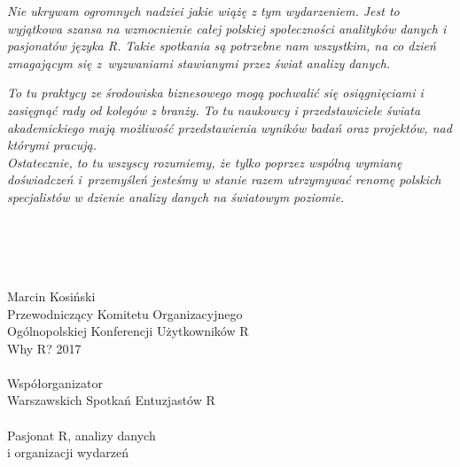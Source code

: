   \textit{Nie ukrywam ogromnych nadziei jakie wiążę z tym wydarzeniem. Jest to wyjątkowa szansa na wzmocnienie całej polskiej społeczności analityków danych i pasjonatów języka R. Takie spotkania są potrzebne nam wszystkim, na co dzień zmagającym się z~wyzwaniami stawianymi przez świat analizy danych.}

  \textit{To tu praktycy ze środowiska biznesowego mogą pochwalić się osiągnięciami i zasięgnąć rady od kolegów z branży. To tu naukowcy i przedstawiciele świata akademickiego mają możliwość przedstawienia wyników badań oraz projektów, nad którymi pracują.\\ Ostatecznie, to tu wszyscy rozumiemy, że tylko poprzez wspólną wymianę doświadczeń i~przemyśleń jesteśmy w stanie razem utrzymywać renomę polskich specjalistów w dzienie analizy danych na światowym poziomie.}

\begin{flushright}
\ \\ \ \\ \ \\ \ \\
Marcin Kosiński \\
Przewodniczący Komitetu Organizacyjnego \\
Ogólnopolskiej Konferencji Użytkowników R  \\
Why R? 2017 \\
\ \\
Współorganizator \\
Warszawskich Spotkań Entuzjastów R \\
\ \\
Pasjonat R, analizy danych \\
i organizacji wydarzeń

\end{flushright}
